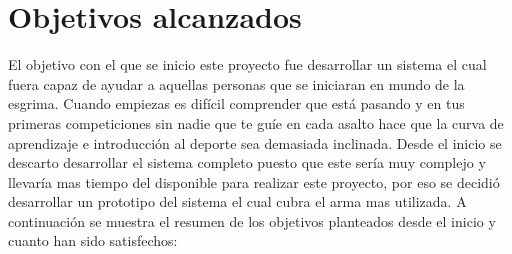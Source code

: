 \section{Objetivos alcanzados}

El objetivo con el que se inicio este proyecto fue desarrollar un sistema el cual
fuera capaz de ayudar a aquellas personas que se iniciaran en mundo de la esgrima.
Cuando empiezas es difícil comprender que está pasando y en tus primeras competiciones
sin nadie que te guíe en cada asalto hace que la curva de aprendizaje e introducción
al deporte sea demasiada inclinada. Desde el inicio se descarto desarrollar el sistema
completo puesto que este sería muy complejo y llevaría mas tiempo del disponible para
realizar este proyecto, por eso se decidió desarrollar un prototipo del sistema el cual
cubra el arma mas utilizada. A continuación se muestra el resumen de los objetivos planteados
desde el inicio y cuanto han sido satisfechos:


